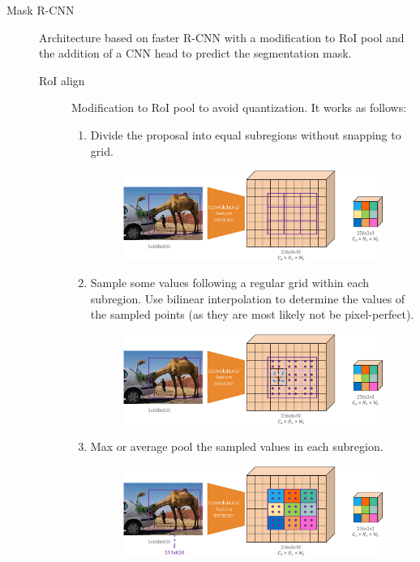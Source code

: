 \begin{description}
    \item[Mask R-CNN] 
        Architecture based on faster R-CNN with a modification to RoI pool and the addition of a CNN head to predict the segmentation mask.

        \begin{description}
            \item[RoI align] 
                Modification to RoI pool to avoid quantization. It works as follows:
                \begin{enumerate}
                    \item Divide the proposal into equal subregions without snapping to grid.
                    \begin{figure}[H]
                        \centering
                        \includegraphics[width=0.7\linewidth]{./img/_roi_align1.pdf}
                    \end{figure}
                    \item Sample some values following a regular grid within each subregion. Use bilinear interpolation to determine the values of the sampled points (as they are most likely not be pixel-perfect).
                    \begin{figure}[H]
                        \centering
                        \includegraphics[width=0.7\linewidth]{./img/_roi_align2.pdf}
                    \end{figure}
                    \item Max or average pool the sampled values in each subregion.
                    \begin{figure}[H]
                        \centering
                        \includegraphics[width=0.7\linewidth]{./img/_roi_align3.pdf}
                    \end{figure}
                \end{enumerate}


\end{description}
\end{description}
